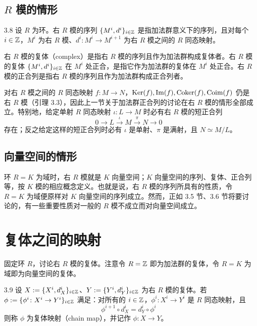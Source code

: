 \subsection{$R$ 模的情形}

\begin{definition}{3.8} 设 $R$ 为环。右 $R$ 模的序列 $\{M^i,d^i\}_{i\in\mathbb{Z}}$ 是指加法群意义下的序列，且对每个 $i\in\mathbb{Z}$，$M^i$ 为右 $R$ 模、$d^i\colon M^i\to M^{i+1}$ 为右 $R$ 模之间的 $R$ 同态映射。
\end{definition}

右 $R$ 模的复体（complex）是指右 $R$ 模的序列且作为加法群构成复体者。右 $R$ 模的复体 $\{M^i,d^i\}_{i\in\mathbb{Z}}$ 在 $M^i$ 处正合，是指它作为加法群的复体在 $M^i$ 处正合。右 $R$ 模的正合列是指右 $R$ 模的序列且作为加法群构成正合列者。

对右 $R$ 模之间的 $R$ 同态映射 $f\colon M\to N$，$\operatorname{Ker}(f),\operatorname{Im}(f),\operatorname{Coker}(f),\operatorname{Coim}(f)$ 仍是右 $R$ 模（引理 3.3），因此上一节关于加法群正合列的讨论在右 $R$ 模的情形全部成立。特别地，给定单射 $R$ 同态映射 $\iota\colon L\to M$ 时必有右 $R$ 模的短正合列
\[
0\to L\xrightarrow{\iota} M\xrightarrow{\pi} N\to 0
\]
存在；反之给定这样的短正合列时必有 $\iota$ 是单射、$\pi$ 是满射，且 $N\simeq M/L$。

\subsection{向量空间的情形}

环 $R=K$ 为域时，右 $R$ 模就是 $K$ 向量空间；$K$ 向量空间的序列、复体、正合列等，按 $K$ 模的相应概念定义。也就是说，右 $R$ 模的序列所具有的性质，令 $R=K$ 为域便原样对 $K$ 向量空间的序列成立。然而，正如 3.5 节、3.6 节将要讨论的，有一些重要性质对一般的 $R$ 模不成立而对向量空间成立。

\section{复体之间的映射}

固定环 $R$，讨论右 $R$ 模的复体。注意令 $R=\mathbb{Z}$ 即为加法群的复体，令 $R=K$ 为域即为向量空间的复体。

\begin{definition}{3.9}
设 $X:=\{X^i,d_X^i\}_{i\in\mathbb{Z}}$、$Y:=\{Y^i,d_Y^i\}_{i\in\mathbb{Z}}$ 为右 $R$ 模的复体。若 $\phi:=\{\phi^i\colon X^i\to Y^i\}_{i\in\mathbb{Z}}$ 满足：对所有的 $i\in\mathbb{Z}$，$\phi^i\colon X^i\to Y^i$ 是 $R$ 同态映射，且
\[
\phi^{i+1}\circ d_X^i = d_Y^i\circ \phi^i
\]
则称 $\phi$ 为复体映射（chain map），并记作 $\phi\colon X\to Y$。
\end{definition}

